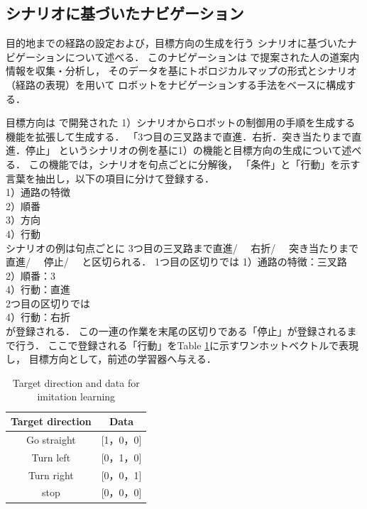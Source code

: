 \documentclass{sice-si}
\begin{document}
\subsection{シナリオに基づいたナビゲーション}
目的地までの経路の設定および，目標方向の生成を行う
シナリオに基づいたナビゲーションについて述べる．
このナビゲーションは\cite{shimada2020}
で提案された人の道案内情報を収集・分析し，
そのデータを基にトポロジカルマップの形式とシナリオ（経路の表現）を用いて
ロボットをナビゲーションする手法をベースに構成する．
\par
目標方向は\cite{shimada2020}
で開発された
1）シナリオからロボットの制御用の手順を生成する機能を拡張して生成する．
「3つ目の三叉路まで直進．右折．突き当たりまで直進．停止」
というシナリオの例を基に1）の機能と目標方向の生成について述べる．
この機能では，シナリオを句点ごとに分解後，
「条件」と「行動」を示す言葉を抽出し，以下の項目に分けて登録する．\\
1）通路の特徴\\
2）順番\\
3）方向\\
4）行動\\
シナリオの例は句点ごとに
3つ目の三叉路まで直進/　
右折/　
突き当たりまで直進/　
停止/　
と区切られる．
1つ目の区切りでは
1）通路の特徴：三叉路\\
2）順番：3\\
4）行動：直進\\
2つ目の区切りでは\\
4）行動：右折\\
が登録される．
この一連の作業を末尾の区切りである「停止」が登録されるまで行う．
ここで登録される「行動」をTable \ref{tab:target}に示すワンホットベクトルで表現し，
目標方向として，前述の学習器へ与える．

\begin{table}[]
    \centering
    \caption{Target direction and data for imitation learning}\label{tab:target}
    \begin{tabular}{|c|c|}
    \hline
    Target direction & Data        \\
    \hline
    Go straight   & {[}1，0，0{]} \\
    Turn left   & {[}0，1，0{]} \\
    Turn right   & {[}0，0，1{]} \\
    stop   & {[}0，0，0{]}\\
    \hline
    \end{tabular}
    \end{table}
\end{document}
